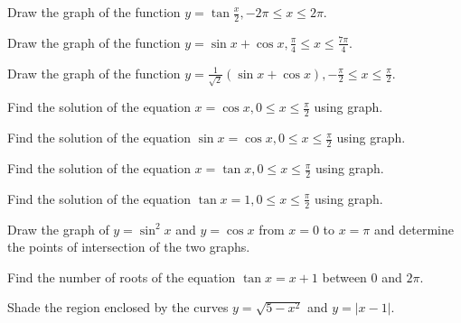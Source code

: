 \item Draw the graph of the function $y = \tan\frac{x}{2}, -2\pi\leq x\leq 2\pi$.

\item Draw the graph of the function $y = \sin x + \cos x, \frac{\pi}{4}\leq x\leq\frac{7\pi}{4}$.

\item Draw the graph of the function $y = \frac{1}{\sqrt{2}}(\sin x + \cos x), -\frac{\pi}{2}\leq
    x\leq\frac{\pi}{2}$.

\item Find the solution of the equation $x = \cos x, 0\leq x\leq\frac{\pi}{2}$ using graph.

\item Find the solution of the equation $\sin x = \cos x, 0\leq x\leq\frac{\pi}{2}$ using graph.

\item Find the solution of the equation $x = \tan x, 0\leq x\leq\frac{\pi}{2}$ using graph.

\item Find the solution of the equation $\tan x = 1, 0\leq x\leq \frac{\pi}{2}$ using graph.

\item Draw the graph of $y = \sin^2x$ and $y = \cos x$ from $x = 0$ to $x = \pi$ and
    determine the points of intersection of the two graphs.

\item Find the number of roots of the equation $\tan x = x + 1$ between $0$ and $2\pi$.

\item Shade the region enclosed by the curves $y = \sqrt{5 - x^2}$ and $y = |x - 1|$.
\stopitemize
